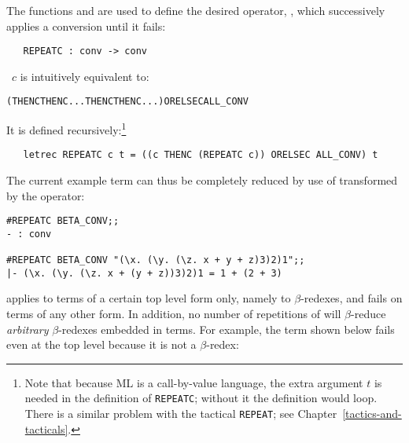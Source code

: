 The functions  and  are used to define the desired
operator, , which 
successively applies a conversion until it fails:

\begin{boxed}
\begin{verbatim}
   REPEATC : conv -> conv
\end{verbatim}\end{boxed}

\noindent {}\ $c$ is intuitively equivalent to:

\begin{hol}\begin{alltt}
   ( THENC  THENC ... THENC  THENC ...) ORELSEC ALL_CONV
\end{alltt}\end{hol}

\noindent It is defined recursively:\footnote{Note that because ML
is a call-by-value language, the extra argument
$t$ is needed in the definition of {\tt REPEATC}; without it the definition would
loop. There is a similar problem with the tactical {\tt REPEAT}; see
Chapter~\ref{tactics-and-tacticals}.}

\begin{hol}\begin{verbatim}
   letrec REPEATC c t = ((c THENC (REPEATC c)) ORELSEC ALL_CONV) t
\end{verbatim}\end{hol}

The current example term can thus be completely reduced by use of
 transformed by the  operator:

\setcounter{sessioncount}{1}
\begin{session}\begin{verbatim}
#REPEATC BETA_CONV;;
- : conv

#REPEATC BETA_CONV "(\x. (\y. (\z. x + y + z)3)2)1";;
|- (\x. (\y. (\z. x + (y + z))3)2)1 = 1 + (2 + 3)
\end{verbatim}\end{session}

 applies to terms of a certain top level
form only, namely
to $\beta$-redexes, and fails on terms of any other form.
In addition, no number of repetitions of  will $\beta$-reduce
{\it arbitrary\/} $\beta$-redexes embedded in terms.  For example,
the term shown below fails even at the top level because it is not a
$\beta$-redex:

